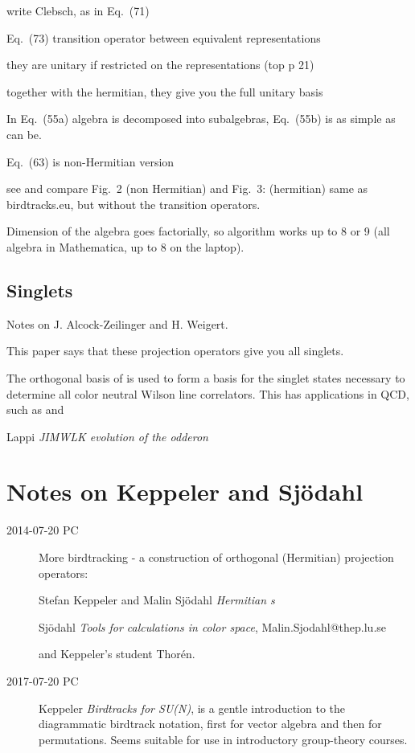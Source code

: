 write Clebsch, as in Eq.~(71)

Eq.~(73) transition operator between equivalent representations

they are unitary if restricted on the representations (top p 21)

together with the hermitian, they give you the full unitary basis

In Eq.~(55a) algebra is decomposed into subalgebras,
Eq.~(55b) is as simple as can be.

Eq.~(63) is non-Hermitian version

see and compare Fig.~2 (non Hermitian) and Fig.~3: (hermitian)
same as birdtracks.eu, but without the transition operators.

Dimension of the algebra goes factorially, so algorithm works up to 8 or 9
(all algebra in Mathematica, up to 8 on the laptop).

\subsection{Singlets}
\label{s-AlcZei16-4}


Notes on J. Alcock-Zeilinger and H. Weigert.

This paper says that these projection operators give you all singlets.

The orthogonal basis of  is used to form a basis for the
singlet states necessary to determine all color neutral Wilson line
correlators. This has applications in  QCD, such as 
and

Lappi \etal{}
{\em {JIMWLK} evolution of the odderon}



\section{Notes on Keppeler and Sj{\"o}dahl}
\label{s-KeppSjo14}

\begin{description}

\item[2014-07-20 PC] More birdtracking - a construction of orthogonal
(Hermitian) projection operators:

{Stefan Keppeler} and Malin Sj{\"o}dahl {\em Hermitian \Ypo s}

Sj{\"o}dahl {\em Tools for calculations in color
space}, Malin.Sjodahl@thep.lu.se

and Keppeler's student Thor{\'e}n.

\item[2017-07-20 PC] Keppeler
{\em {Birdtracks for SU(N)}},  is
a gentle introduction to the diagrammatic birdtrack notation, first for
vector algebra and then for permutations. Seems suitable for use in
introductory group-theory courses.

\end{description}

